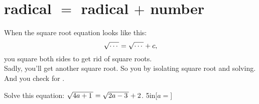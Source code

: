 \section{radical $=$ radical $+$ number}

\begin{tcolorbox}[center,width=6in,colback=white]
    When the square root equation looks like this:
    {
    \[
        \myRoot{\cdots} = \myRoot{\cdots} + c\text{,}
    \]
    }%
    you {square} {both} {sides} 
    to get rid of  square roots.\\[\baselineskip]
    Sadly, you'll get another square root. 
    So you   by isolating  square root 
    and solving.
    And you  check for  .
\end{tcolorbox}

\myWideProblem
{
    Solve this equation: \quad $\myRoot{4a+1} = \myRoot{2a-3} + 2$.
}{5in}[\raggedleft$a=$]